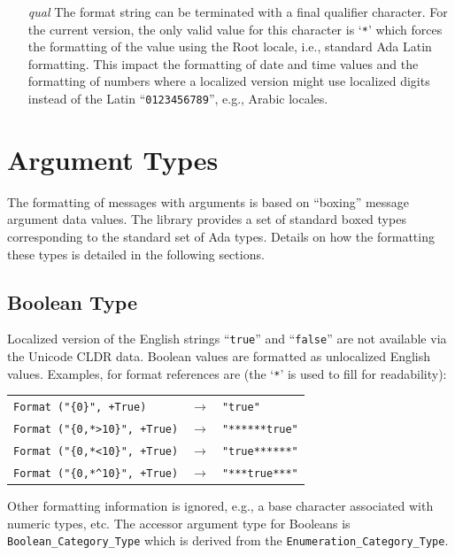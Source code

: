 \begin{itemize}
\item[\textit{qual}]
    The format string can be terminated with a final qualifier character.  For
    the current version, the only valid value for this character is `\texttt{*}'
    which forces the formatting of the value using the Root locale, i.e.,
    standard Ada Latin formatting.  This impact the formatting of date and time
    values and the formatting of numbers where a localized version might use
    localized digits instead of the Latin ``\texttt{0123456789}'', e.g.,
    Arabic locales.
\end{itemize}

\section{Argument Types}
\label{sec:argtypes}

The formatting of messages with arguments is based on ``boxing'' message
argument data values.  The library provides a set of standard boxed types
corresponding to the standard set of Ada types.  Details on how the formatting
these types is detailed in the following sections.

\subsection{Boolean Type}

Localized version of the English strings ``\texttt{true}'' and
``\texttt{false}'' are not available via the Unicode CLDR data.  Boolean
values are formatted as unlocalized English values.  Examples, for format
references are (the `\texttt{*}' is used to fill for readability):
\begin{center}
\begin{tabular}{lll}
\verb|Format ("{0}", +True)| & $\rightarrow$ & \verb|"true"|\\
\verb|Format ("{0,*>10}", +True)| & $\rightarrow$ & \verb|"******true"|\\
\verb|Format ("{0,*<10}", +True)| & $\rightarrow$ & \verb|"true******"|\\
\verb|Format ("{0,*^10}", +True)| & $\rightarrow$ & \verb|"***true***"|\\
\end{tabular}
\end{center}
Other formatting information is ignored, e.g., a base character associated
with numeric types, etc.  The accessor argument type for Booleans is
\texttt{Boolean\_Category\_Type} which is derived from the
\texttt{Enumeration\_Category\_Type}.

